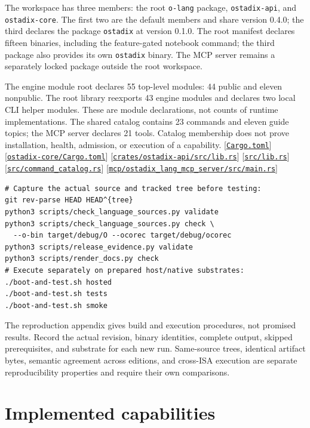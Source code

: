 \documentclass[11pt,oneside]{article}
\newcommand{\src}[1]{\textcolor{OSlate}{\scriptsize[\href{https://github.com/lostadi/OSTADIX/blob/c0b02c326b2329a95ba52447c7180bc93957cd57/#1}{\nolinkurl{#1}}]}\allowbreak}
\begin{document}
The workspace has three members: the root \texttt{o-lang} package,
\texttt{ostadix-api}, and \texttt{ostadix-core}. The first two are the default
members and share version 0.4.0; the third declares the package
\texttt{ostadix} at version 0.1.0. The root manifest declares fifteen binaries,
including the feature-gated notebook command; the third package also provides
its own \texttt{ostadix} binary. The MCP server remains a separately locked
package outside the root workspace.

The engine module root declares 55 top-level modules: 44 public and eleven
nonpublic. The root library reexports 43 engine modules and declares two
local CLI helper modules. These are module declarations, not counts of
runtime implementations. The shared catalog contains 23 commands and eleven
guide topics; the MCP server declares 21 tools. Catalog membership does not
prove installation, health, admission, or execution of a capability.
\src{Cargo.toml}
\src{ostadix-core/Cargo.toml}
\src{crates/ostadix-api/src/lib.rs}
\src{src/lib.rs}
\src{src/command_catalog.rs}
\src{mcp/ostadix_lang_mcp_server/src/main.rs}

\begin{lstlisting}[style=plaincode]
# Capture the actual source and tracked tree before testing:
git rev-parse HEAD HEAD^{tree}
python3 scripts/check_language_sources.py validate
python3 scripts/check_language_sources.py check \
  --o-bin target/debug/O --ocorec target/debug/ocorec
python3 scripts/release_evidence.py validate
python3 scripts/render_docs.py check
# Execute separately on prepared host/native substrates:
./boot-and-test.sh hosted
./boot-and-test.sh tests
./boot-and-test.sh smoke
\end{lstlisting}

The reproduction appendix gives build and execution procedures, not promised
results. Record the actual revision, binary identities, complete output,
skipped prerequisites, and substrate for each new run. Same-source trees,
identical artifact bytes, semantic agreement across editions, and cross-ISA
execution are separate reproducibility properties and require their own
comparisons.


\section{Implemented capabilities}
\label{sec:claims}
\end{document}

